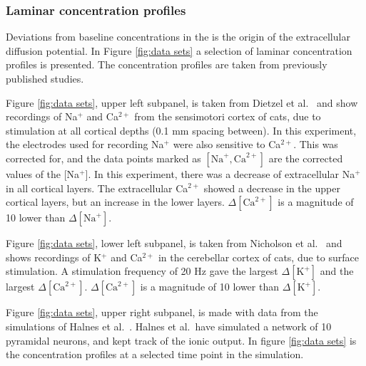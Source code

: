 \documentclass{article}
\begin{document}
\subsubsection{Laminar concentration profiles}

Deviations from baseline concentrations in the is the origin of the extracellular diffusion potential. In Figure \ref{fig:data sets} a selection of laminar concentration profiles is presented. The concentration profiles are taken from previously published studies. 

Figure \ref{fig:data sets}, upper left subpanel, is taken from Dietzel et al.\ \cite{Dietzel1982}  and show recordings of Na$^+$ and Ca$^{2+}$ from the sensimotori cortex of cats, due to stimulation at all cortical depths (0.1 mm spacing between).  In this experiment, the electrodes used for recording Na$^+$ were also sensitive to Ca$^{2+}$. This was corrected for, and the data points marked as $[\text{Na}^+, \text{Ca}^{2+}]$ are the corrected values of the [Na$^+$]. In this experiment, there was a decrease of extracellular Na$^+$ in all cortical layers. The extracellular Ca$^{2+}$ showed a decrease in the upper cortical layers, but an increase in the lower layers. $\Delta [\text{Ca}^{2+}]$ is  a magnitude of 10 lower than  $\Delta [\text{Na}^+]$.

Figure \ref{fig:data sets}, lower left subpanel, is taken from Nicholson et al.\ \cite{Nicholson1987} and shows recordings of K$^+$ and Ca$^{2+}$ in the cerebellar cortex of cats, due to surface stimulation. A stimulation frequency of 20 Hz gave the largest $\Delta [\text{K}^+]$ and the largest $\Delta [\text{Ca}^{2+}]$.   $\Delta [\text{Ca}^{2+}]$ is  a magnitude of 10 lower than  $\Delta [\text{K}^+]$.


Figure \ref{fig:data sets}, upper right subpanel, is made with data from the simulations of Halnes et al.\ \cite{Halnes2016}. Halnes et al.\ have simulated a network of 10 pyramidal neurons, and kept track of the ionic output. In figure \ref{fig:data sets} is the concentration profiles at a selected time point in the simulation.
\end{document}
